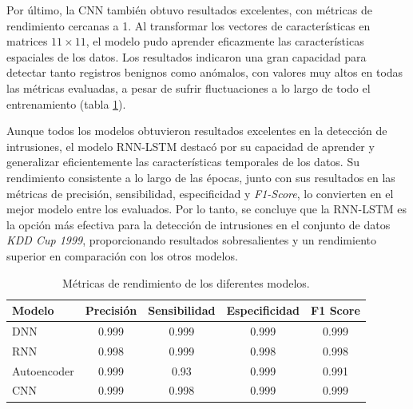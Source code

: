 Por último, la CNN también obtuvo resultados excelentes, con métricas de rendimiento cercanas a 1. Al transformar los vectores de características en matrices $11 \times 11$, el modelo pudo aprender eficazmente las características espaciales de los datos. Los resultados indicaron una gran capacidad para detectar tanto registros benignos como anómalos, con valores muy altos en todas las métricas evaluadas, a pesar de sufrir fluctuaciones a lo largo de todo el entrenamiento (tabla \ref{tab:conclusionModels}).

Aunque todos los modelos obtuvieron resultados excelentes en la detección de intrusiones, el modelo RNN-LSTM destacó por su capacidad de aprender y generalizar eficientemente las características temporales de los datos. Su rendimiento consistente a lo largo de las épocas, junto con sus resultados en las métricas de precisión, sensibilidad, especificidad y \textit{F1-Score}, lo convierten en el mejor modelo entre los evaluados. Por lo tanto, se concluye que la RNN-LSTM es la opción más efectiva para la detección de intrusiones en el conjunto de datos \textit{KDD Cup 1999}, proporcionando resultados sobresalientes y un rendimiento superior en comparación con los otros modelos.

\begin{table}[H]
\centering
\begin{tabular}{|l|c|c|c|c|}
\hline
\textbf{Modelo} & \textbf{Precisión} & \textbf{Sensibilidad} & \textbf{Especificidad} & \textbf{F1 Score} \\ \hline
DNN & 0.999 & 0.999 & 0.999 & 0.999 \\ \hline
RNN & 0.998 & 0.999 & 0.998 & 0.998 \\ \hline
Autoencoder & 0.999 & 0.93 & 0.999 & 0.991 \\ \hline
CNN & 0.999 & 0.998 & 0.999 & 0.999 \\ \hline
\end{tabular}
\caption{Métricas de rendimiento de los diferentes modelos.}
\label{tab:conclusionModels}
\end{table}






